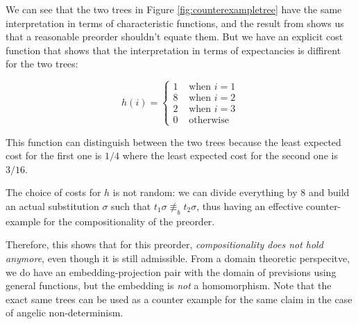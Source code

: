 \begin{ensps}
We can see that the two trees in Figure \ref{fig:counterexampletree} 
have the same interpretation in terms of characteristic functions,
and the result from \cite{Mislove2000} shows us that a reasonable 
preorder shouldn't equate them. But we have an explicit 
cost function that shows that the interpretation in terms of 
expectancies is diffirent for the two trees:

\begin{equation*}
    h (i) = \begin{cases}
        1 & \text{ when } i = 1 \\
        8 & \text{ when } i = 2 \\
        2 & \text{ when } i = 3 \\
        0 & \text{ otherwise } 
    \end{cases}
\end{equation*}

This function can distinguish between the two trees 
because the least expected cost for the first one is $1/4$
where the least expected cost for the second one is $3/16$.

The choice of costs for $h$ is not random: we can divide 
everything by $8$ and build an actual substitution $\sigma$
such that $t_1 \sigma \not \equiv_{b} t_2 \sigma$, thus 
having an effective counter-example for the compositionality 
of the preorder.
\end{ensps}

Therefore,
this shows that for this preorder, \emph{compositionality
does not hold anymore}, even though 
it is still admissible. From a domain theoretic perspecitve,
we do have an embedding-projection pair with the domain 
of previsions using general functions, but the embedding 
is \emph{not} a homomorphism. Note that the exact same trees can be used 
as a counter example for the same claim in the case of angelic non-determinism. 
